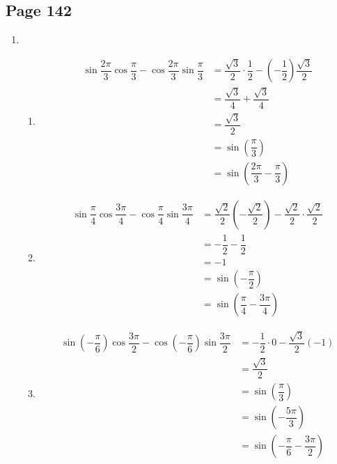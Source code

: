 \documentclass{article}
\newenvironment{solutions}[1]
{\subsection*{#1}
 \begin{enumerate}[leftmargin=1.5em]}
{\end{enumerate}}
\newcommand{\solution}{\item}
\newenvironment{subsolutions}
{\begin{enumerate}}
{\end{enumerate}}
\newcommand{\subsolution}{\item}
\begin{document}
\begin{solutions}{Page 142}
$\cos{\alpha} < 0$, $\cos{\beta} > 0$:
\begin{align*}
\sin\left(\alpha+\beta\right) &= \sin{\alpha}\cos{\beta} + \cos{\alpha}\sin{\beta} \\
&= \dfrac{3}{5} \cdot \dfrac{12}{13} + \left(-\dfrac{4}{5}\right) \cdot \dfrac{5}{13} \\
&= \dfrac{36}{65} - \dfrac{20}{65} \\
&= \dfrac{16}{65}
\end{align*}

$\cos{\alpha} < 0$, $\cos{\beta} < 0$:
\begin{align*}
\sin\left(\alpha+\beta\right) &= \sin{\alpha}\cos{\beta} + \cos{\alpha}\sin{\beta} \\
&= \dfrac{3}{5} \left(-\dfrac{12}{13}\right) + \left(-\dfrac{4}{5}\right) \cdot \dfrac{5}{13} \\
&= -\dfrac{36}{65} - \dfrac{20}{65} \\
&= -\dfrac{56}{65}
\end{align*}

There are four possible answers for $\sin\left(\alpha+\beta\right)$.

\solution %
\begin{subsolutions}
\subsolution %
\begin{align*}
\sin{\dfrac{2\pi}{3}}\cos{\dfrac{\pi}{3}} - \cos{\dfrac{2\pi}{3}}\sin{\dfrac{\pi}{3}} &= \dfrac{\sqrt{3}}{2} \cdot \dfrac{1}{2} - \left(-\dfrac{1}{2}\right) \dfrac{\sqrt{3}}{2} \\
&= \dfrac{\sqrt{3}}{4} + \dfrac{\sqrt{3}}{4} \\
&= \dfrac{\sqrt{3}}{2} \\
&= \sin\left(\dfrac{\pi}{3}\right) \\
&= \sin\left(\dfrac{2\pi}{3} - \dfrac{\pi}{3}\right)
\end{align*}

\subsolution %
\begin{align*}
\sin{\dfrac{\pi}{4}}\cos{\dfrac{3\pi}{4}} - \cos{\dfrac{\pi}{4}}\sin{\dfrac{3\pi}{4}} &= \dfrac{\sqrt{2}}{2} \left(-\dfrac{\sqrt{2}}{2}\right) - \dfrac{\sqrt{2}}{2} \cdot \dfrac{\sqrt{2}}{2} \\
&= -\dfrac{1}{2} - \dfrac{1}{2} \\
&= -1 \\
&= \sin\left(-\dfrac{\pi}{2}\right) \\
&= \sin\left(\dfrac{\pi}{4} - \dfrac{3\pi}{4}\right)
\end{align*}

\subsolution %
\begin{align*}
\sin\left(-\dfrac{\pi}{6}\right)\cos{\dfrac{3\pi}{2}} - \cos\left(-\dfrac{\pi}{6}\right)\sin{\dfrac{3\pi}{2}} &= -\dfrac{1}{2} \cdot 0 - \dfrac{\sqrt{3}}{2} \left(-1\right) \\
&= \dfrac{\sqrt{3}}{2} \\
&= \sin\left(\dfrac{\pi}{3}\right) \\
&= \sin\left(-\dfrac{5\pi}{3}\right) \\
&= \sin\left(-\dfrac{\pi}{6} - \dfrac{3\pi}{2}\right)
\end{align*}


\end{subsolutions}
\end{solutions}
\end{document}
